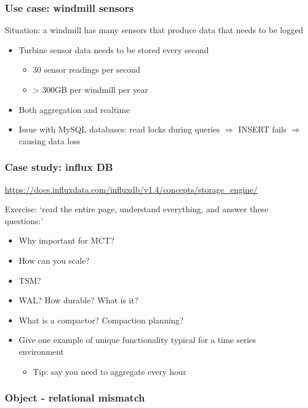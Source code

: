 \documentclass{article}
\begin{document}
\subsubsection{Use case: windmill sensors}

Situation: a windmill has many sensors that produce data that needs to be logged

\begin{itemize}
    \item Turbine sensor data needs to be stored every second
    \begin{itemize}
        \item 30 sensor readings per second
        \item > 300GB per windmill per year
    \end{itemize}
    \item Both aggregation and realtime
    \item Issue with MySQL databases: read locks during queries $\Rightarrow$ INSERT fails $\Rightarrow$ causing data loss
\end{itemize}

\subsubsection{Case study: influx DB}

\url{https://docs.influxdata.com/influxdb/v1.4/concepts/storage_engine/}

Exercise: `read the entire page, understand everything, and answer these questions:'

\begin{itemize}
    \item Why important for MCT?
    \item How can you scale?
    \item TSM?
    \item WAL? How durable? What is it?
    \item What is a compactor? Compaction planning?
    \item Give one example of unique functionality typical for a time series environment
    \begin{itemize}
        \item Tip: say you need to aggregate every hour
    \end{itemize}
\end{itemize}

\subsubsection{Object - relational mismatch}
\end{document}
